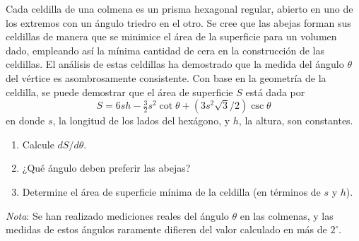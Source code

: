 \item Cada celdilla de una colmena es un prisma hexagonal regular, abierto en uno de los extremos con un ángulo triedro en el otro. Se cree que las abejas forman sus celdillas de manera que se minimice el área de la superficie para un volumen dado, empleando así la mínima cantidad de cera en la construcción de las celdillas. El análisis de estas celdillas ha demostrado que la medida del ángulo $\theta$ del vértice es asombrosamente consistente. Con base en la geometría de la celdilla, se puede demostrar que el área de superficie $S$ está dada por
$$S = 6sh - \tfrac{3}{2}s^2 \cot \theta + (3s^2\sqrt{3}/2)\csc \theta$$
en donde $s$, la longitud de los lados del hexágono, y $h$, la altura, son constantes.
\begin{enumerate}
    \item[(a)] Calcule $dS/d\theta$.
    \item[(b)] ¿Qué ángulo deben preferir las abejas?
    \item[(c)] Determine el área de superficie mínima de la celdilla (en términos de $s$ y $h$).
\end{enumerate}
\textit{Nota}: Se han realizado mediciones reales del ángulo $\theta$ en las colmenas, y las medidas de estos ángulos raramente difieren del valor calculado en más de $2^\circ$.
\begin{center}
\end{center}
